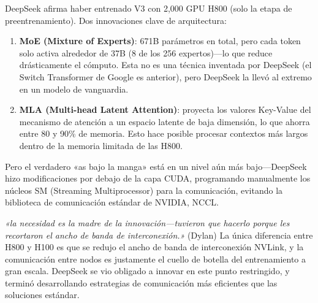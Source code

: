 \documentclass[a4paper]{article}
\begin{document}
DeepSeek afirma haber entrenado V3 con 2,000 GPU H800 (solo la etapa de preentrenamiento). Dos innovaciones clave de arquitectura:

\begin{enumerate}
    \item \textbf{MoE (Mixture of Experts)}: 671B parámetros en total, pero cada token solo activa alrededor de 37B (8 de los 256 expertos)—lo que reduce drásticamente el cómputo. Esta no es una técnica inventada por DeepSeek (el Switch Transformer de Google es anterior), pero DeepSeek la llevó al extremo en un modelo de vanguardia.
    \item \textbf{MLA (Multi-head Latent Attention)}: proyecta los valores Key-Value del mecanismo de atención a un espacio latente de baja dimensión, lo que ahorra entre 80 y 90\% de memoria. Esto hace posible procesar contextos más largos dentro de la memoria limitada de las H800.
\end{enumerate}

Pero el verdadero «as bajo la manga» está en un nivel aún más bajo—DeepSeek hizo modificaciones por debajo de la capa CUDA, programando manualmente los núcleos SM (Streaming Multiprocessor) para la comunicación, evitando la biblioteca de comunicación estándar de NVIDIA, NCCL.

\textit{«la necesidad es la madre de la innovación—tuvieron que hacerlo porque les recortaron el ancho de banda de interconexión.»} (Dylan) La única diferencia entre H800 y H100 es que se redujo el ancho de banda de interconexión NVLink, y la comunicación entre nodos es justamente el cuello de botella del entrenamiento a gran escala. DeepSeek se vio obligado a innovar en este punto restringido, y terminó desarrollando estrategias de comunicación más eficientes que las soluciones estándar.
\end{document}
